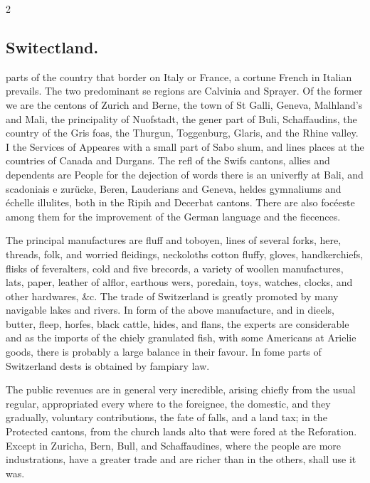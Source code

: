 \documentclass[10pt]{article}
\begin{document}
\begin{multicols}{2}\raggedcolumns
\subsection*{Switectland.}
parts of the country that border on Italy or France, a cortune French in Italian prevails. The two predominant se regions are Calvinia and Sprayer. Of the former we are the centons of Zurich and Berne, the town of St Galli, Geneva, Malhland’s and Mali, the principality of Nuofstadt, the gener part of Buli, Schaffaudins, the country of the Gris foas, the Thurgun, Toggenburg, Glaris, and the Rhine valley. I the Services of Appeares with a small part of Sabo shum, and lines places at the countries of Canada and Durgans. The refl of the Swifs cantons, allies and dependents are People for the dejection of words there is an univerfly at Bali, and scadoniais e zurücke, Beren, Lauderians and Geneva, heldes gymnaliums and échelle illulites, both in the Ripih and Decerbat cantons. There are also focéeste among them for the improvement of the German language and the fiecences.

The principal manufactures are fluff and toboyen, lines of several forks, here, threads, folk, and worried fleidings, neckoloths cotton fluffy, gloves, handkerchiefs, flisks of feveralters, cold and five brecords, a variety of woollen manufactures, lats, paper, leather of alflor, earthous wers, poredain, toys, watches, clocks, and other hardwares, \&c. The trade of Switzerland is greatly promoted by many navigable lakes and rivers. In form of the above manufacture, and in dieels, butter, fleep, horfes, black cattle, hides, and flans, the experts are considerable and as the imports of the chiely granulated fish, with some Americans at Arielie goods, there is probably a large balance in their favour. In fome parts of Switzerland dests is obtained by fampiary law.

The public revenues are in general very incredible, arising chiefly from the usual regular, appropriated every where to the foreignee, the domestic, and they gradually, voluntary contributions, the fate of falls, and a land tax; in the Protected cantons, from the church lands alto that were fored at the Reforation. Except in Zuricha, Bern, Bull, and Schaffaudines, where the people are more industrations, have a greater trade and are richer than in the others, shall use it was.


\end{multicols}
\end{document}
